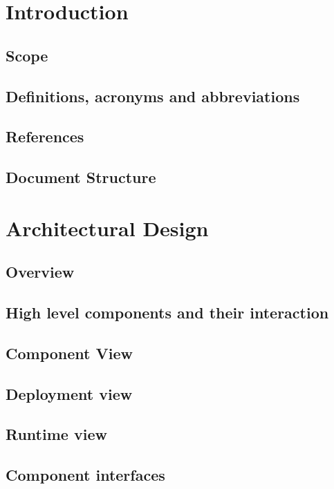 \documentclass{../Common/Structure/doc_pdf}
\begin{document}
\titleToc

\chapter{Introduction}

\section{Scope}

\section{Definitions, acronyms and abbreviations}

\section{References}

\section{Document Structure}

\newpage

\chapter{Architectural Design}
\section{Overview}

\section{High level components and their interaction}
\section{Component View}
\section{Deployment view}
\section{Runtime view}
\section{Component interfaces}
\end{document}
